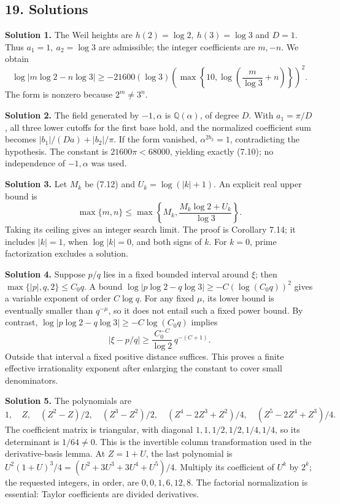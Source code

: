 \documentclass[
  11pt,
  a4paper,
]{article}
\begin{document}
\subsection{19. Solutions}\label{solutions}

\textbf{Solution 1.} The Weil heights are \(h(2)=\log2,\ h(3)=\log3\)
and \(D=1\). Thus \(a_1=1,\ a_2=\log3\) are admissible; the integer
coefficients are \(m,-n\). We obtain \[
\log|m\log2-n\log3|
\ge-21600(\log3)
\left(\max\left\{10,\log\left(\frac m{\log3}+n\right)\right\}\right)^2.
\] The form is nonzero because \(2^m\ne3^n\).

\textbf{Solution 2.} The field generated by \(-1,\alpha\) is
\(\mathbb Q(\alpha)\), of degree \(D\). With \(a_1=\pi/D\), all three
lower cutoffs for the first base hold, and the normalized coefficient
sum becomes \(|b_1|/(Da)+|b_2|/\pi\). If the form vanished,
\(\alpha^{2b_2}=1\), contradicting the hypothesis. The constant is
\(21600\pi<68000\), yielding exactly (7.10); no independence of
\(-1,\alpha\) was used.

\textbf{Solution 3.} Let \(M_k\) be (7.12) and \(U_k=\log(|k|+1)\). An
explicit real upper bound is \[
\max\{m,n\}\le
\max\left\{M_k,\frac{M_k\log2+U_k}{\log3}\right\}.
\] Taking its ceiling gives an integer search limit. The proof is
Corollary 7.14; it includes \(|k|=1\), when \(\log|k|=0\), and both
signs of \(k\). For \(k=0\), prime factorization excludes a solution.

\textbf{Solution 4.} Suppose \(p/q\) lies in a fixed bounded interval
around \(\xi\); then \(\max\{|p|,q,2\}\le C_0q\). A bound
\(\log|p\log2-q\log3|\ge-C(\log(C_0q))^2\) gives a variable exponent of
order \(C\log q\). For any fixed \(\mu\), its lower bound is eventually
smaller than \(q^{-\mu}\), so it does not entail such a fixed power
bound. By contrast, \(\log|p\log2-q\log3|\ge-C\log(C_0q)\) implies \[
|\xi-p/q|\ge\frac{C_0^{-C}}{\log2}\,q^{-(C+1)}.
\] Outside that interval a fixed positive distance suffices. This proves
a finite effective irrationality exponent after enlarging the constant
to cover small denominators.

\textbf{Solution 5.} The polynomials are \[
1,\quad Z,\quad (Z^2-Z)/2,\quad (Z^3-Z^2)/2,\quad
(Z^4-2Z^3+Z^2)/4,\quad (Z^5-2Z^4+Z^3)/4.
\] The coefficient matrix is triangular, with diagonal
\(1,1,1/2,1/2,1/4,1/4\), so its determinant is \(1/64\ne0\). This is the
invertible column transformation used in the derivative-basis lemma. At
\(Z=1+U\), the last polynomial is
\(U^2(1+U)^3/4=(U^2+3U^3+3U^4+U^5)/4\). Multiply its coefficient of
\(U^k\) by \(2^k\); the requested integers, in order, are
\(0,0,1,6,12,8\). The factorial normalization is essential: Taylor
coefficients are divided derivatives.
\end{document}
